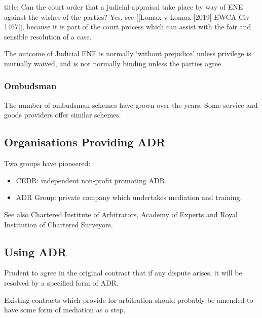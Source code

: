 \documentclass[
]{article}
\newenvironment{Shaded}{}{}
\newcommand{\NormalTok}[1]{#1}
\providecommand{\tightlist}{%
  \setlength{\itemsep}{0pt}\setlength{\parskip}{0pt}}
\begin{document}
\begin{Shaded}
\begin{Highlighting}[]
\NormalTok{title: Can the court order that a judicial appraisal take place by way of ENE against the wishes of the parties?}
\NormalTok{Yes, see [[Lomax v Lomax [2019] EWCA Civ 1467]], because it is part of the court process which can assist with the fair and sensible resolution of a case.}
\end{Highlighting}
\end{Shaded}

The outcome of Judicial ENE is normally `without prejudice' unless
privilege is mutually waived, and is not normally binding unless the
parties agree.

\hypertarget{ombudsman}{%
\subsubsection{Ombudsman}\label{ombudsman}}

The number of ombudsman schemes have grown over the years. Some service
and goods providers offer similar schemes.

\hypertarget{organisations-providing-adr}{%
\subsection{Organisations Providing
ADR}\label{organisations-providing-adr}}

Two groups have pioneered:

\begin{itemize}
\tightlist
\item
  CEDR: independent non-profit promoting ADR
\item
  ADR Group: private company which undertakes mediation and training.
\end{itemize}

See also Chartered Institute of Arbitrators, Academy of Experts and
Royal Institution of Chartered Surveyors.

\hypertarget{using-adr}{%
\subsection{Using ADR}\label{using-adr}}

Prudent to agree in the original contract that if any dispute arises, it
will be resolved by a specified form of ADR.

Existing contracts which provide for arbitration should probably be
amended to have some form of mediation as a step.
\end{document}
